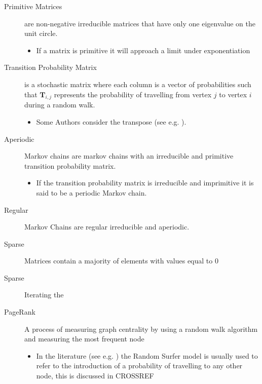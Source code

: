 \documentclass[11pt]{article}
\begin{document}
\begin{description}
\begin{description}
\begin{itemize}
\end{itemize}
\end{description}
\item[{Primitive Matrices}] are non-negative irreducible matrices that have only one eigenvalue on the unit circle.
\begin{itemize}
\item If a matrix is primitive it will approach a limit under exponentiation \cite[]{langvilleGooglePageRankScience2012}
\end{itemize}
\item[{Transition Probability Matrix}] is a stochastic matrix where each column is a vector of probabilities such that \(\mathbf{T}_{i,j}\) represents the probability of travelling from vertex \(j\) to vertex \(i\) during a random walk.
\begin{itemize}
\item Some Authors consider the transpose (see e.g. \cite{langvilleGooglePageRankScience2012}).
\end{itemize}
\item[{Aperiodic}] Markov chains are markov chains with an irreducible and primitive transition probability matrix.
\begin{itemize}
\item If the transition probability matrix is irreducible and imprimitive it is said to be a periodic Markov chain.
\end{itemize}
\item[{Regular}] Markov Chains are regular irreducible and aperiodic.
\item[{Sparse}] Matrices contain a majority of elements with values equal to 0 \cite[]{langvilleGooglePageRankScience2012}
\item[{Sparse}] Iterating the
\item[{PageRank}] A process of measuring graph centrality by using a random walk algorithm and measuring the most frequent node
\begin{itemize}
\item In the literature (see e.g. \cite{guptaWTFWhoFollow2013,langvilleGooglePageRankScience2012}) the Random Surfer model is usually used to refer to the introduction of a probability of travelling to any other node, this is discussed in CROSSREF
\end{itemize}
\end{description}
\end{document}
